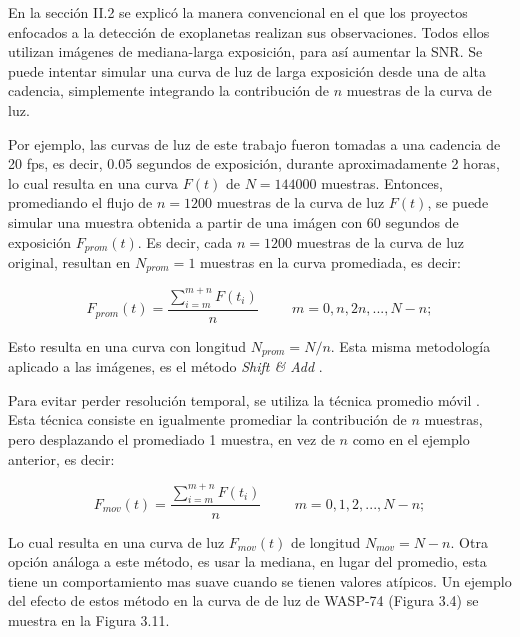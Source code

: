 En la sección II.2 se explicó la manera convencional en el que los proyectos enfocados a la detección de exoplanetas realizan sus observaciones. Todos ellos utilizan imágenes de mediana-larga exposición, para así aumentar la SNR. Se puede intentar simular una curva de luz de larga exposición desde una de alta cadencia, simplemente integrando la contribución de $n$ muestras de la curva de luz. 

Por ejemplo, las curvas de luz de este trabajo fueron tomadas a una cadencia de 20 fps, es decir, 0.05 segundos de exposición, durante aproximadamente 2 horas, lo cual resulta en una curva $F(t)$ de $N=144000$ muestras. Entonces, promediando el flujo de $n=1200$ muestras de la curva de luz $F(t)$, se puede simular una muestra obtenida a partir de una imágen con 60 segundos de exposición $F_{prom}(t)$. Es decir, cada $n=1200$ muestras de la curva de luz original, resultan en $N_{prom}=1$ muestras en la curva promediada, es decir:

\begin{equation}
  \displaystyle F_{prom}(t)=  \dfrac{\sum\limits_{i=m}^{m+n} F(t_{i})}{n}\hspace{1cm}m=0,n,2n,...,N-n;
\end{equation}

Esto resulta en una curva con longitud $N_{prom}=N/n$. Esta misma metodología aplicado a las imágenes, es el método \textit{Shift \& Add} \cite{kluckers1996comparison}.

Para evitar perder resolución temporal, se utiliza la técnica promedio móvil \cite{borucki2009kepler}. Esta técnica consiste en igualmente promediar la contribución de $n$ muestras, pero desplazando el promediado 1 muestra, en vez de $n$ como en el ejemplo anterior, es decir:

\begin{equation}
  \displaystyle  F_{mov}(t)=  \dfrac{\sum\limits_{i=m}^{m+n} F(t_{i})}{n}\hspace{1cm}m=0,1,2,...,N-n;
\end{equation}

Lo cual resulta en una curva de luz $F_{mov}(t)$ de longitud  $N_{mov}=N-n$. Otra opción análoga a este método, es usar la mediana, en lugar del promedio, esta tiene un comportamiento mas suave cuando se tienen valores atípicos. Un ejemplo del efecto de estos método en la curva de de luz de WASP-74 (Figura 3.4) se muestra en la Figura 3.11.

